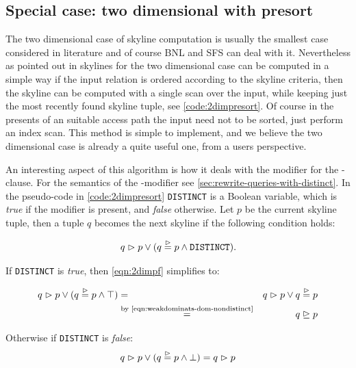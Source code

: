 \subsection{Special case: two dimensional with presort}
\label{sec:presort}
The two dimensional case of skyline computation is usually the
smallest case considered in literature and of course BNL and SFS can
deal with it.  Nevertheless as pointed out in \citep{Borzsonyi2001}
skylines for the two dimensional case can be computed in a simple way
if the input relation is ordered according to the skyline criteria,
then the skyline can be computed with a single scan over the
input, while keeping just the most recently found skyline tuple, see
\autoref{code:2dimpresort}.  Of course in the presents of an
suitable access path the input need not to be sorted, just perform an
index scan.  This method is simple to implement, and we believe the
two dimensional case is already a quite useful one, from a users
perspective.

An interesting aspect of this algorithm is how it deals with the
 modifier for the -clause.
%
For the semantics of the -modifier see
\autoref{sec:rewrite-queries-with-distinct}.
%
In the pseudo-code in \autoref{code:2dimpresort} \texttt{DISTINCT}
is a Boolean variable, which is \emph{true} if the
 modifier is present, and \emph{false}
otherwise. Let $p$ be the current skyline tuple, then a tuple $q$
becomes the next skyline if the following condition holds:

\begin{equation}\label{eqn:2dimpf}
q \vartriangleright p \lor (q \stackrel{\vartriangleright}{=} p \land \text{\texttt{DISTINCT}}).
\end{equation}

\noindent
If \texttt{DISTINCT} is \emph{true}, then \eqref{eqn:2dimpf} simplifies to:

\begin{eqnarray}
q \vartriangleright p \lor (q \stackrel{\vartriangleright}{=} p \land \top) &=& q \vartriangleright p \lor q \stackrel{\vartriangleright}{=} p \nonumber\\
&\stackrel{\textnormal{by \eqref{eqn:weakdominats-dom-nondistinct}}}{=}& q \trianglerighteq p
\end{eqnarray}

\noindent
Otherwise if \texttt{DISTINCT} is \emph{false}:
%
\begin{equation}
q \vartriangleright p \lor (q \stackrel{\vartriangleright}{=} p \land \bot) = q \vartriangleright p
\end{equation}

